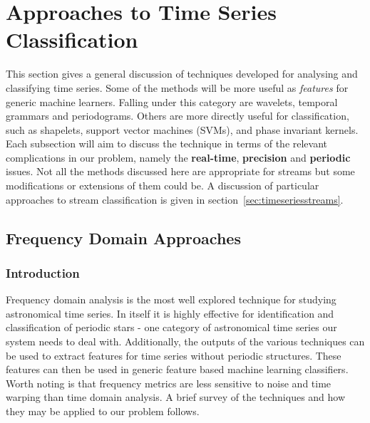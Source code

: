 	\section{Approaches to Time Series Classification}
	This section gives a general discussion of techniques developed for analysing and classifying time series. Some of the methods will be more useful as \emph{features} for generic machine learners. Falling under this category are wavelets, temporal grammars and periodograms. Others are more directly useful for classification, such as shapelets, support vector machines (SVMs), and phase invariant kernels. Each subsection will aim to discuss the technique in terms of the relevant complications in our problem, namely the \textbf{real-time}, \textbf{precision} and \textbf{periodic} issues. Not all the methods discussed here are appropriate for streams but some modifications or extensions of them could be. A discussion of particular approaches to stream classification is given in section~\ref{sec:timeseriesstreams}.
	

	
	\subsection{Frequency Domain Approaches}
	\subsubsection{Introduction}
	Frequency domain analysis is the most well explored technique for studying astronomical time series. In itself it is highly effective for identification and classification of periodic stars - one category of astronomical time series our system needs to deal with. Additionally, the outputs of the various techniques can be used to extract features for time series without periodic structures. These features can then be used in generic feature based machine learning classifiers. Worth noting is that frequency metrics are less sensitive to noise and time warping than time domain analysis. A brief survey of the techniques and how they may be applied to our problem follows.
